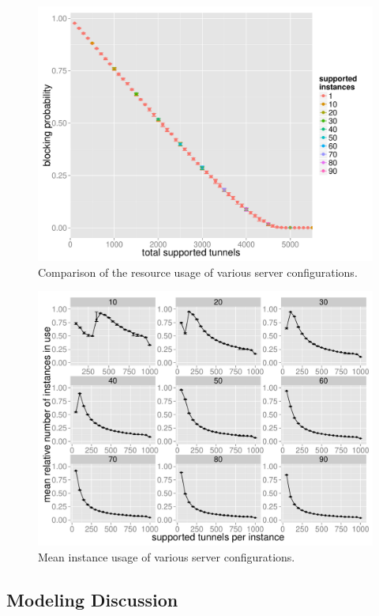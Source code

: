 \begin{figure}[htb]
  \centering
  \includegraphics[width=1.0\textwidth]{images/feasiblemultiserver-blockprob.pdf}
  \caption{Comparison of the resource usage of various server configurations.}
 \label{c4:fig:res-usage-multiserver}
\end{figure}

\begin{figure}[htb]
  \centering
  \includegraphics[width=1.0\textwidth]{images/instanceuse-mean.pdf}
  \caption{Mean instance usage of various server configurations.}
 \label{c4:fig:res-instance-usage-mean}
\end{figure}



\subsection{Modeling Discussion}

